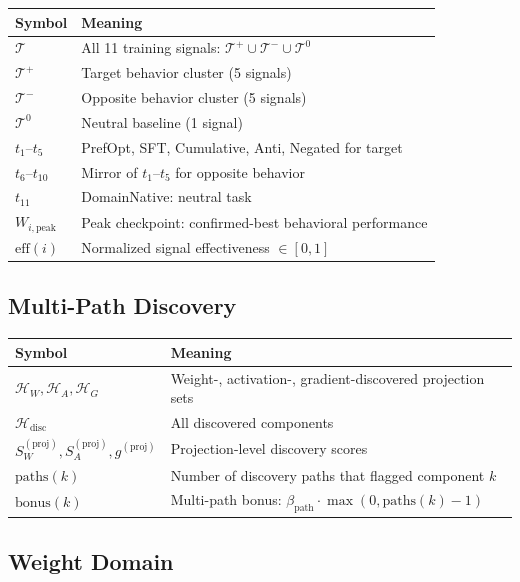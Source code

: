 \documentclass[11pt]{article}
\begin{document}
\begin{center}
\begin{tabular}{lp{}}
\toprule
\textbf{Symbol} & \textbf{Meaning} \\
\midrule
$\mathcal{T}$ & All 11 training signals: $\mathcal{T}^+ \cup \mathcal{T}^- \cup \mathcal{T}^0$ \\
$\mathcal{T}^+$ & Target behavior cluster (5 signals) \\
$\mathcal{T}^-$ & Opposite behavior cluster (5 signals) \\
$\mathcal{T}^0$ & Neutral baseline (1 signal) \\
$t_1$--$t_5$ & PrefOpt, SFT, Cumulative, Anti, Negated for target \\
$t_6$--$t_{10}$ & Mirror of $t_1$--$t_5$ for opposite behavior \\
$t_{11}$ & DomainNative: neutral task \\
$W_{i,\text{peak}}$ & Peak checkpoint: confirmed-best behavioral performance \\
$\text{eff}(i)$ & Normalized signal effectiveness $\in [0,1]$ \\
\bottomrule
\end{tabular}
\end{center}

\subsection{Multi-Path Discovery}

\begin{center}
\begin{tabular}{ll}
\toprule
\textbf{Symbol} & \textbf{Meaning} \\
\midrule
$\mathcal{H}_W, \mathcal{H}_A, \mathcal{H}_G$ & Weight-, activation-, gradient-discovered projection sets \\
$\mathcal{H}_{\text{disc}}$ & All discovered components \\
$S^{(\text{proj})}_W, S^{(\text{proj})}_A, g^{(\text{proj})}$ & Projection-level discovery scores \\
$\text{paths}(k)$ & Number of discovery paths that flagged component $k$ \\
$\text{bonus}(k)$ & Multi-path bonus: $\beta_{\text{path}} \cdot \max(0, \text{paths}(k) - 1)$ \\
\bottomrule
\end{tabular}
\end{center}

\subsection{Weight Domain}
\end{document}
